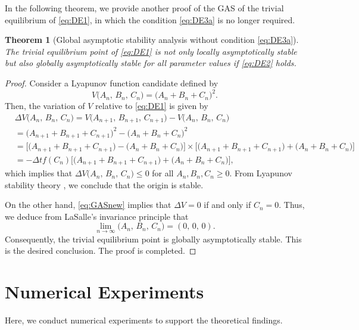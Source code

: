 \documentclass[12pt]{article}
\newtheorem{theorem}{Theorem}[section]
\theoremstyle{definition}
\theoremstyle{remark}
\numberwithin{equation}{section}
\begin{document}
{
In the following theorem, we provide another proof of the GAS of the trivial equilibrium of \eqref{eq:DE1}, in which the condition \eqref{eq:DE3a} is no longer required.
}
\begin{theorem}[Global asymptotic stability analysis without condition \eqref{eq:DE3a}]\label{Theorem6new}
The trivial equilibrium point of \eqref{eq:DE1} is not only locally asymptotically stable but also globally asymptotically stable for all parameter values if \eqref{eq:DE2} holds.
\end{theorem}
\begin{proof}
Consider a Lyapunov function candidate defined by
\begin{equation*}
V\big(A_n,\,B_n,\,C_n\big) = \big(A_n + B_n + C_n\big)^2.
\end{equation*}
Then, the variation of $V$ relative to \eqref{eq:DE1} is given by
\begin{equation}\label{eq:GASnew}
\begin{split}
&\Delta V\big(A_n,\,B_n,\,C_n\big)  = V\big(A_{n + 1},\,B_{n + 1},\,C_{n + 1}\big) - V\big(A_n,\,B_n,\,C_n\big) \\
&= \big(A_{n+1} + B_{n+1} + C_{n+1}\big)^2 - \big(A_n + B_n + C_n\big)^2\\
&= \Big[\big(A_{n+1} + B_{n+1} + C_{n+1}\big) - \big(A_n + B_n + C_n\big)\Big] \times \Big[\big(A_{n+1} + B_{n+1} + C_{n+1}\big) + \big(A_n + B_n + C_n\big)\Big]\\
&=-\Delta t f(C_n)\Big[\big(A_{n+1} + B_{n+1} + C_{n+1}\big) + \big(A_n + B_n + C_n\big)\Big],
\end{split}
\end{equation}
which implies that $\Delta V\big(A_n,\,B_n,\,C_n\big)  \leq 0$ for all $A_n, B_n, C_n \geq 0$. From Lyapunov stability theory \cite{Elaydi, LaSalle}, we conclude that the origin is stable.

On the other hand, \eqref{eq:GASnew} implies that $\Delta V = 0$ if and only if $C_n = 0$. Thus, we deduce from LaSalle's invariance principle \cite{Elaydi, LaSalle} that
\begin{equation*}
\lim_{n \to \infty}\big(A_n,\,B_n,\,C_n\big) = (0,\,0,\,0).
\end{equation*}
Consequently, the trivial equilibrium point is globally asymptotically stable. This is the desired conclusion. The proof is completed.
\end{proof}
\section{Numerical Experiments}\label{Sec3}
Here, we conduct numerical experiments to support the theoretical findings. 
\end{document}
